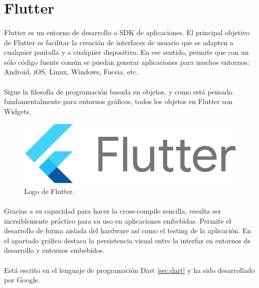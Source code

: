 \section{Flutter}\label{sec:flutter}

\paragraph{} Flutter es un entorno de desarrollo o \gls{SDK} de aplicaciones. El principal
objetivo de Flutter es facilitar la creación de interfaces de usuario que se adapten a
cualquier pantalla y a cualquier dispositivo. En ese sentido, permite que con un sólo
código fuente común se puedan generar aplicaciones para muchos entornos: Android, iOS,
Linux, Windows, Fucsia, etc.
\cite{flutter}

\paragraph{} Sigue la filosofía de programación basada en objetos, y como está pensado
fundamentalmente para entornos gráficos, todos los objetos en Flutter son \gls{Widgets}.

\begin{figure}[h]
	\centering
	\includegraphics[width=0.50\linewidth]{imgs/flutter-logo}
	\caption[Flutter Logo]{Logo de Flutter.}
	\label{fig:flutter}
\end{figure}

\paragraph{} Gracias a su capacidad para hacer la \gls{cross-compile} sencilla, resulta
ser increiblemente práctico para su uso en aplicaciones embebidas. Permite el desarrollo
de forma aislada del hardware así como el testing de la aplicación. En el apartado
gráfico destaca la persistencia visual entre la interfaz en entornos de desarrollo y
entornos embebidos.

\paragraph{} Está escrito en el lenguaje de programación Dart \ref{sec:dart} y ha sido
desarrollado por Google.

